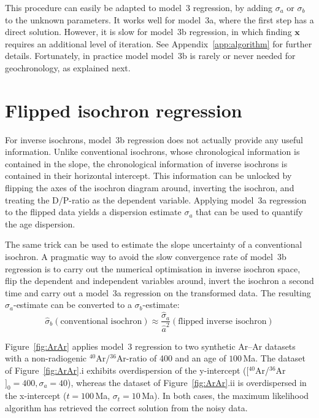 \documentclass{article}
\begin{document}
This procedure can easily be adapted to model~3 regression, by adding
$\sigma_a$ or $\sigma_b$ to the unknown parameters. It works well for
model~3a, where the first step has a direct solution. However, it is
slow for model~3b regression, in which finding $\mathbf{x}$ requires
an additional level of iteration.  See Appendix~\ref{app:algorithm}
for further details.  Fortunately, in practice model model~3b is
rarely or never needed for geochronology, as explained next.

\section{Flipped isochron regression}\label{sec:flipper}

For inverse isochrons, model~3b regression does not actually provide
any useful information. Unlike conventional isochrons, whose
chronological information is contained in the slope, the chronological
information of inverse isochrons is contained in their horizontal
intercept. This information can be unlocked by flipping the axes of
the isochron diagram around, inverting the isochron, and treating the
D/P-ratio as the dependent variable. Applying model~3a regression to
the flipped data yields a dispersion estimate $\sigma_a$ that can be
used to quantify the age dispersion.\medskip

The same trick can be used to estimate the slope uncertainty of a
conventional isochron. A pragmatic way to avoid the slow convergence
rate of model~3b regression is to carry out the numerical optimisation
in inverse isochron space, flip the dependent and independent
variables around, invert the isochron a second time and carry out a
model~3a regression on the transformed data.  The resulting
$\sigma_a$-estimate can be converted to a $\sigma_b$-estimate:
\begin{equation}
  \hat{\sigma}_b(\mbox{conventional isochron})
  \approx
  \frac{\hat{\sigma}_a}{\hat{a}^2}(\mbox{flipped inverse isochron})
\end{equation}

Figure~\ref{fig:ArAr} applies model~3 regression to two synthetic
Ar--Ar datasets with a non-radiogenic ${}^{40}$Ar/${}^{36}$Ar-ratio of
400 and an age of $100$\,Ma. The dataset of Figure~\ref{fig:ArAr}.i
exhibits overdispersion of the y-intercept
($[{}^{40}$Ar/${}^{36}$Ar$]_0 = 400, \sigma_a=40$), whereas the
dataset of Figure~\ref{fig:ArAr}.ii is overdispersed in the
x-intercept ($t = 100$\,Ma, $\sigma_t=10$\,Ma). In both cases, the
maximum likelihood algorithm has retrieved the correct solution from
the noisy data.
\end{document}
